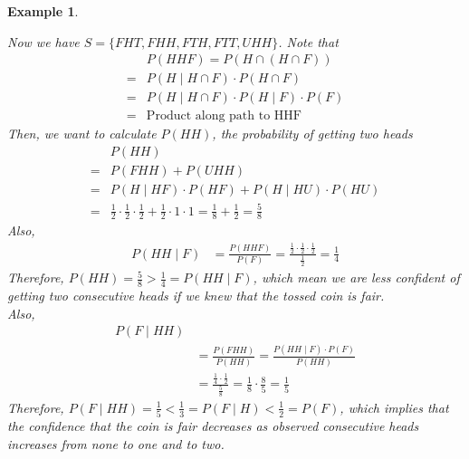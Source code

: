 \documentclass[11pt,oneside]{book}
\theoremstyle{newStyle}
\newtheorem{ex}{Example}[section]
\begin{document}
\begin{ex}
\begin{center}
\end{center}
Now we have $S=\{FHT,FHH,FTH,FTT,UHH\}$. Note that \begin{align*}
&P(HHF)=P(H\cap (H\cap F))\\
=&P(H\mid H\cap F)\cdot P(H\cap F)\\
=&P(H\mid H\cap F)\cdot P(H\mid F)\cdot P(F)\\
=&\text{Product along path to HHF}
\end{align*}
Then, we want to calculate $P(HH)$, the probability of getting two heads\begin{align*}
&P(HH)\\
=&P(FHH)+P(UHH)\\
=&P(H\mid HF)\cdot P(HF)+P(H\mid HU)\cdot P(HU)\\
=&\frac{1}{2}\cdot \frac{1}{2}\cdot \frac{1}{2}+\frac{1}{2}\cdot 1\cdot 1
=\frac{1}{8}+\frac{1}{2}=\frac{5}{8}
\end{align*}
Also, \begin{align*}
P(HH\mid F)&=\frac{P(HHF)}{P(F)}=\frac{\frac{1}{2}\cdot \frac{1}{2}\cdot \frac{1}{2}}{\frac{1}{2}}=\frac{1}{4}
\end{align*}
Therefore, $P(HH)=\frac{5}{8}>\frac{1}{4}=P(HH\mid F)$, which mean we are less confident of getting two consecutive heads if we knew that the tossed coin is fair.\\
Also,  \begin{align*}
P(F\mid HH)\\
&=\frac{P(FHH)}{P(HH)}=\frac{P(HH\mid F)\cdot P(F)}{P(HH)}\\
&=\frac{\frac{1}{4}\cdot \frac{1}{2}}{\frac{5}{8}}=\frac{1}{8}\cdot \frac{8}{5}=\frac{1}{5}
\end{align*}
Therefore, $P(F\mid HH)=\frac{1}{5}<\frac{1}{3}=P(F\mid H)<\frac{1}{2}=P(F)$, which implies that the confidence that the coin is fair decreases as observed consecutive heads increases from none to one and to two.
\end{ex}
\end{document}

